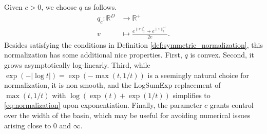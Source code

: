 Given $c > 0$, we choose $q$ as follows.
\begin{align}
q_c: \mathbb R^D  &\to \mathbb R^+ \\
v  &\mapsto \frac{e^{\|v\|_2^c} + e^{\|v\|_2^{-c}}}{2e}.
\label{eq:normalization}
\end{align}
Besides satisfying the conditions in Definition \ref{def:symmetric_normalization}, this normalization has some additional nice properties.
First, $q$ is convex.
Second, it grows asymptotically log-linearly.
Third, while $\exp(-|\log t|) = \exp(-\max (t, 1/t))$ is a seemingly natural choice for normalization, it is non smooth, and the LogSumExp \citep{Boyd2004-ql} replacement of $\max (t, 1/t)$ with $ \log (\exp (t ) + \exp(1/t))$ simplifies to \ref{eq:normalization} upon exponentiation.
Finally, the parameter $c$ grants control over the width of the basin, which may be useful for avoiding numerical issues arising close to $0$ and $\infty$.

